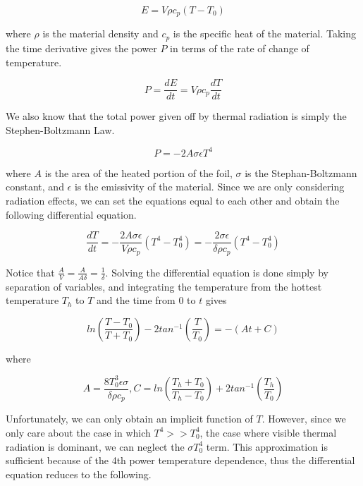 \documentclass[12pt]{article}
\begin{document}
\begin{equation}
E=V \rho c_p (T-T_0)
\end{equation}

where $\rho$ is the material density and $c_p$ is the specific heat of the material. Taking the time derivative gives the power $P$ in terms of the rate of change of temperature.

\begin{equation}
P=\frac{dE}{dt}=V \rho c_p \frac{dT}{dt}
\end{equation}

We also know that the total power given off by thermal radiation is simply the Stephen-Boltzmann Law.

\begin{equation}
P=-2 A \sigma \epsilon T^4
\end{equation}

where $A$ is the area of the heated portion of the foil, $\sigma$ is the Stephan-Boltzmann constant, and $\epsilon$ is the emissivity of the material. Since we are only considering radiation effects, we can set the equations equal to each other and obtain the following differential equation.

\begin{equation}
\frac{dT}{dt}=-\frac{2 A \sigma \epsilon}{V \rho c_p} (T^4-T_{0}^{4})=-\frac{2 \sigma \epsilon}{\delta \rho c_p} (T^4-T_{0}^{4})
\end{equation}

Notice that $\frac{A}{V}=\frac{A}{A \delta}=\frac{1}{\delta}$. Solving the differential equation is done simply by separation of variables, and integrating the temperature from the hottest temperature $T_h$ to $T$ and the time from $0$ to $t$ gives

\begin{equation}
ln(\frac{T-T_0}{T+T_0})-2tan^{-1}(\frac{T}{T_0})=-(At+C)
\end{equation}

where

\begin{equation}
A=\frac{8T_{0}^{3} \epsilon \sigma}{\delta \rho c_p}, C=ln(\frac{T_h+T_0}{T_h-T_0})+2tan^{-1}(\frac{T_h}{T_0})
\end{equation}

Unfortunately, we can only obtain an implicit function of $T$. However, since we only care about the case in which $T^4>>T_{0}^{4}$, the case where visible thermal radiation is dominant, we can neglect the $\sigma T_{0}^{4}$ term. This approximation is sufficient because of the 4th power temperature dependence, thus the differential equation reduces to the following.
\end{document}
